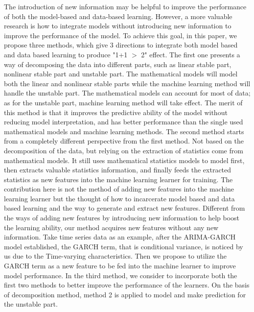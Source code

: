 The introduction of new information may be helpful to  improve the performance of both the model-based and data-based learning. However, a more valuable research is how to integrate models without introducing new information to improve the performance of the model. To achieve this goal, in this paper, we propose three methods, which give 3 directions to integrate both model based and data based learning to produce "1+1 $>$ 2" effect. The first one presents a  way of decomposing the data into different parts, such as linear stable part, nonlinear stable part  and unstable part. The mathematical models will model both the linear and nonlinear stable parts while the machine learning method will handle the unstable part. The mathematical models can account for most of data; as for the unstable part, machine learning method will take effect. The merit of this method is that it improves the predictive ability of the model without reducing model interpretation, and has better performance than the single used mathematical models and machine learning methods. The second method starts from a completely different perspective from the first method. Not based on the decomposition of the data, but relying on the extraction of statistics come from mathematical models. It still uses mathematical statistics models to model first, then extracts valuable statistics information, and finally feeds the extracted statistics as new features into the machine learning learner for training. The contribution here is not the method of adding new features into the machine learning learner but the thought of how to incarcerate model based and data based learning and the way to generate and extract new features. Different from the  ways of adding new features by introducing new information to help boost the learning ability, our method acquires new features without any new information. Take time series data as an example, after the ARIMA-GARCH model established, the GARCH term, that is conditional variance, is noticed by us due to the Time-varying characteristics. Then we propose to utilize the GARCH term as a new feature to be fed into the machine learner to improve model performance. In the third method, we consider to incorporate both the first two methods to better improve the performance of the learners. On the basis of  decomposition method, method 2 is applied to model and make prediction for the unstable part.